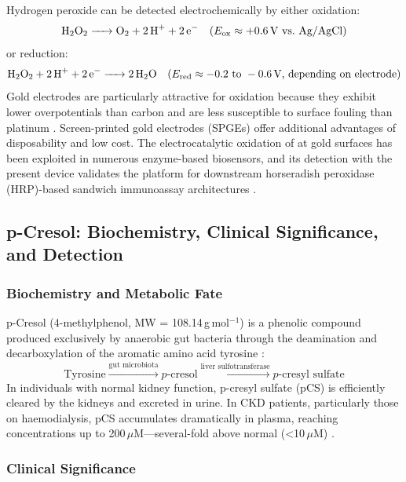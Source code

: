Hydrogen peroxide can be detected electrochemically by either oxidation:
\begin{equation}
    \ce{H2O2 -> O2 + 2H+ + 2e-} \quad (E_\text{ox} \approx +0.6\,\text{V vs.\ Ag/AgCl})
\end{equation}
or reduction:
\begin{equation}
    \ce{H2O2 + 2H+ + 2e- -> 2H2O} \quad (E_\text{red} \approx -0.2 \text{ to } -0.6\,\text{V, depending on electrode})
\end{equation}
Gold electrodes are particularly attractive for  oxidation because they exhibit lower overpotentials than carbon and are less susceptible to surface fouling than platinum \cite{Fanjul-Bolado2008}. Screen-printed gold electrodes (SPGEs) offer additional advantages of disposability and low cost. The electrocatalytic oxidation of  at gold surfaces has been exploited in numerous enzyme-based biosensors, and its detection with the present device validates the platform for downstream horseradish peroxidase (HRP)-based sandwich immunoassay architectures \cite{Wang2006}.

\subsection{p-Cresol: Biochemistry, Clinical Significance, and Detection}
\label{subsec:pcresol}

\subsubsection{Biochemistry and Metabolic Fate}
p-Cresol (4-methylphenol, MW = 108.14\,g\,mol$^{-1}$) is a phenolic compound produced exclusively by anaerobic gut bacteria through the deamination and decarboxylation of the aromatic amino acid tyrosine \cite{Vanholder2003}:
\begin{equation}
    \text{Tyrosine} \xrightarrow{\text{gut microbiota}} p\text{-cresol} \xrightarrow{\text{liver sulfotransferase}} p\text{-cresyl sulfate}
\end{equation}
In individuals with normal kidney function, p-cresyl sulfate (pCS) is efficiently cleared by the kidneys and excreted in urine. In CKD patients, particularly those on haemodialysis, pCS accumulates dramatically in plasma, reaching concentrations up to 200\,$\mu$M---several-fold above normal (\textless{}10\,$\mu$M) \cite{Vanholder2003, Ramezani2016}.

\subsubsection{Clinical Significance}

